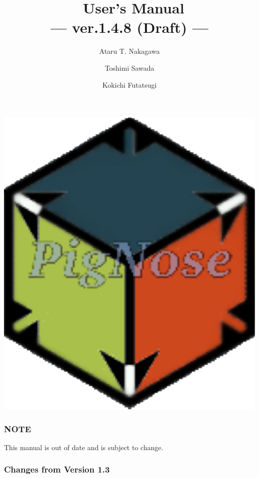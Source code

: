 \documentclass[a4paper]{memoir}
\begin{document}
\tightlists
\midsloppy
{}
\frontmatter
\pagestyle{empty}
\title{\cafeobj~User's Manual \\ --- ver.1.4.8 (Draft) ---}
\author{Ataru T. Nakagawa \and Toshimi Sawada \and Kokichi Futatsugi}
\date{}


\maketitle
\vfill
\begin{center}
\includegraphics[scale=0.2]{cafe-logo.pdf}
\end{center}
\vfill
\Hline
\subsubsection*{NOTE}
This manual is out of date and is subject to change.

\subsubsection*{Changes from Version 1.3}
\end{document}
